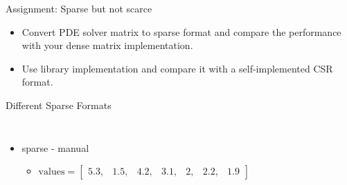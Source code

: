\documentclass[aspectratio=169,xcolor=dvipsnames]{beamer}
\begin{document}

\begin{frame}{Assignment: Sparse but not scarce}
	\begin{itemize}
	    \item Convert PDE solver matrix to sparse format and compare the performance with your
	dense matrix implementation.
		\item Use library implementation and compare it with a self-implemented CSR format.

	\end{itemize}
\end{frame}

\begin{frame}{Different Sparse Formats}
    \begin{columns}[c] %

\begin{itemize}
\item sparse - manual
  \begin{itemize}
     	\item $\mathrm{values} =  \begin{bmatrix} 
		5.3, & 1.5, & 4.2, & 3.1, & 2, & 2.2, & 1.9 
		\end{bmatrix}$


\end{itemize}
\end{itemize}
\end{columns}
\end{frame}
\end{document}
